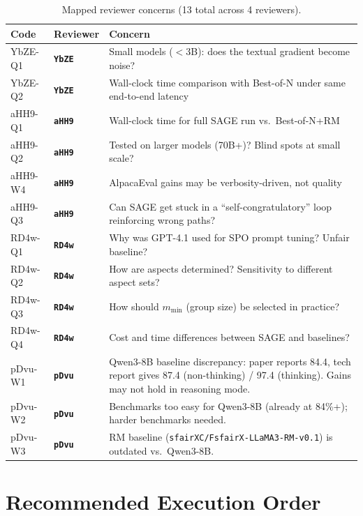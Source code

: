 \documentclass[11pt,a4paper]{article}
\newcommand{\rev}[1]{\texttt{\textbf{#1}}}
\begin{document}
\begin{table}[h!]
\centering
\renewcommand{\arraystretch}{1.3}
\begin{tabularx}{\textwidth}{llX}
\toprule
\textbf{Code} & \textbf{Reviewer} & \textbf{Concern} \\
\midrule
YbZE-Q1 & \rev{YbZE} & Small models ($<$3B): does the textual gradient become noise? \\
YbZE-Q2 & \rev{YbZE} & Wall-clock time comparison with Best-of-N under same end-to-end latency \\
\midrule
aHH9-Q1 & \rev{aHH9} & Wall-clock time for full SAGE run vs.\ Best-of-N+RM \\
aHH9-Q2 & \rev{aHH9} & Tested on larger models (70B+)? Blind spots at small scale? \\
aHH9-W4 & \rev{aHH9} & AlpacaEval gains may be verbosity-driven, not quality \\
aHH9-Q3 & \rev{aHH9} & Can SAGE get stuck in a ``self-congratulatory'' loop reinforcing wrong paths? \\
\midrule
RD4w-Q1 & \rev{RD4w} & Why was GPT-4.1 used for SPO prompt tuning? Unfair baseline? \\
RD4w-Q2 & \rev{RD4w} & How are aspects determined? Sensitivity to different aspect sets? \\
RD4w-Q3 & \rev{RD4w} & How should $m_{\min}$ (group size) be selected in practice? \\
RD4w-Q4 & \rev{RD4w} & Cost and time differences between SAGE and baselines? \\
\midrule
pDvu-W1 & \rev{pDvu} & Qwen3-8B baseline discrepancy: paper reports 84.4, tech report gives 87.4 (non-thinking) / 97.4 (thinking). Gains may not hold in reasoning mode. \\
pDvu-W2 & \rev{pDvu} & Benchmarks too easy for Qwen3-8B (already at 84\%+); harder benchmarks needed. \\
pDvu-W3 & \rev{pDvu} & RM baseline (\texttt{sfairXC/FsfairX-LLaMA3-RM-v0.1}) is outdated vs.\ Qwen3-8B. \\
\bottomrule
\end{tabularx}
\caption{Mapped reviewer concerns (13 total across 4 reviewers).}
\end{table}

\section{Recommended Execution Order}
\end{document}

